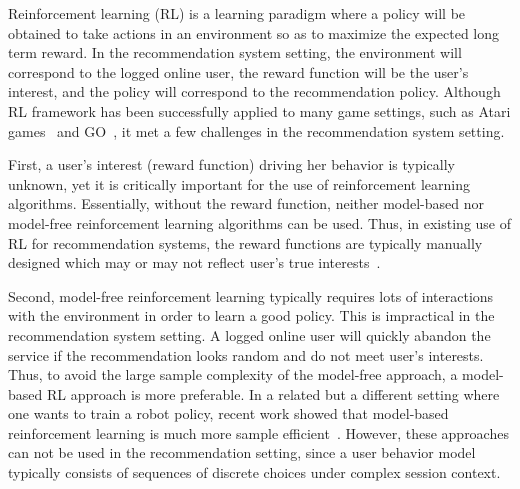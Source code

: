 \documentclass{article} %
\begin{document}
Reinforcement learning (RL) is a learning paradigm where a policy will be obtained to take actions in an environment so as to maximize the expected long term reward. In the recommendation system setting, the environment will correspond to the logged online user, the reward function will be the user's interest, and the policy will correspond to the recommendation policy. Although RL framework has been successfully applied to many game settings, such as Atari games~\citep{MniKavSilRusetal15} and GO~\citep{SilHuaMadGueetal16}, it met a few challenges in the recommendation system setting.

First, a user's interest (reward function) driving her behavior is typically unknown, yet it is critically important for the use of reinforcement learning algorithms. Essentially, without the reward function, neither model-based nor model-free reinforcement learning algorithms can be used. Thus, in existing use of RL for recommendation systems, the reward functions are typically manually designed which may or may not reflect user's true interests~\citep{zhao2018deep,zheng2018drn}.

Second, model-free reinforcement learning typically requires lots of interactions with the environment in order to learn a good policy. This is impractical in the recommendation system setting. A logged online user will quickly abandon the service if the recommendation looks random and do not meet user's interests. Thus, to avoid the large sample complexity of the model-free approach, a model-based RL approach is more preferable.
In a related but a different setting where one wants to train a robot policy, recent work showed that model-based reinforcement learning is much more sample efficient~\citep{NagabandiKahn17, DeisenrothFox15, IgnasiPieter18}. However, these approaches can not be used in the recommendation setting, since a user behavior model typically consists of sequences of discrete choices under complex session context.
\end{document}
